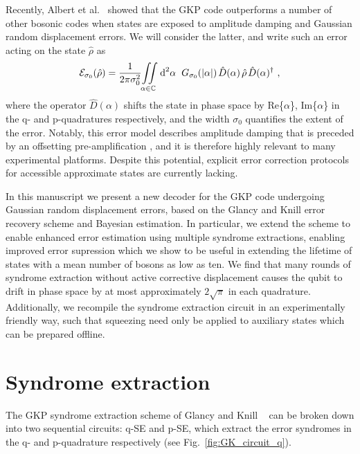 \documentclass[prx,reprint,superscriptaddress,longbibliography,floatfix,nofootinbib]{revtex4-1}
\begin{document}
Recently, Albert et al.~\cite{2017arXiv170805010A} showed that the GKP code outperforms a number of other bosonic codes when states are exposed to amplitude damping and Gaussian random displacement errors. We will consider the latter, and write such an error acting on the state $\hat{\rho}$ as
\begin{equation}
\mathcal{E}_{\sigma_0}(\hat{\rho}) = \frac{1}{2\pi\sigma_0^2}\displaystyle{\int\!\!\!\int \displaylimits_{\hspace{-0.2cm}\alpha\in\mathbb{C}}} \!\! \hspace{0.2cm} \text{d}^{2}\alpha \hspace{0.2cm} G_{\sigma_0}(|\alpha|) \hspace{0.05cm} \hat{D}(\alpha) \hspace{0.05cm} \hat{\rho} \hspace{0.05cm} \hat{D}(\alpha)^{\dagger} \ , 
\end{equation}
where the operator $\hat{D}(\alpha)$ shifts the state in phase space by Re\{$\alpha$\}, Im\{$\alpha$\} in the q- and p-quadratures respectively, and the width $\sigma_0$ quantifies the extent of the error.    Notably, this error model describes amplitude damping that is preceded by an offsetting pre-amplification \cite{8482307}, and it is therefore highly relevant to many experimental platforms. Despite this potential, explicit error correction protocols for accessible approximate states are currently lacking.

In this manuscript we present a new decoder for the GKP code undergoing Gaussian random displacement errors, based on the Glancy and Knill error recovery scheme and Bayesian estimation.
In particular, we extend the scheme to enable enhanced error estimation using multiple syndrome extractions, enabling improved error supression which we show to be useful in extending the lifetime of states with a mean number of bosons as low as ten.
We find that many rounds of syndrome extraction without active corrective displacement causes the qubit to drift in phase space by at most approximately $2\sqrt{\pi}$ in each quadrature.
Additionally, we recompile the syndrome extraction circuit in an experimentally friendly way, such that squeezing need only be applied to auxiliary states which can be prepared offline.
 

\section{Syndrome extraction}   The GKP syndrome extraction scheme of Glancy and Knill ~\cite{PhysRevA.73.012325} can be broken down into two sequential circuits: q-SE and p-SE, which extract the error syndromes in the q- and p-quadrature respectively (see Fig.~\ref{fig:GK_circuit_q}).
\end{document}
